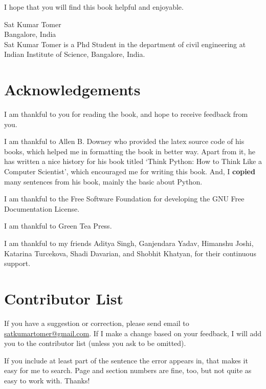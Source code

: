 \documentclass[10pt]{book}
\begin{document}
I hope that you will find this book helpful and enjoyable. \\

\vfill


Sat Kumar Tomer \\
Bangalore, India\\

Sat Kumar Tomer is a Phd Student in the department of civil engineering at Indian Institute of Science, Bangalore, India.


\section*{Acknowledgements}

I am thankful to you for reading the book, and hope to receive feedback from you.

I am thankful to Allen B. Downey who provided the latex source code of his books, which helped me in formatting the book in better way. Apart from it, he has written a nice history for his book titled `Think Python: How to Think Like a Computer Scientist', which encouraged me for writing this book. And, I \textbf{copied} many sentences from his book, mainly the basic about Python. 

I am thankful to the Free Software Foundation for developing the GNU Free Documentation License.

I am thankful to Green Tea Press.

I am thankful to my friends Aditya Singh, Ganjendara Yadav, Himanshu Joshi, Katarina Turcekova, Shadi Davarian, and Shobhit Khatyan, for their continuous support.

\section*{Contributor List}

If you have a suggestion or correction, please send email to \url{satkumartomer@gmail.com}.  If I make a change based on your feedback, I will add you to the contributor list (unless you ask to be omitted).

If you include at least part of the sentence the error appears in, that makes it easy for me to search.  Page and section numbers are fine, too, but not quite as easy to work with.
Thanks!


\normalsize

\clearemptydoublepage

\begin{latexonly}

\tableofcontents

\clearemptydoublepage

\end{latexonly}
\end{document}
